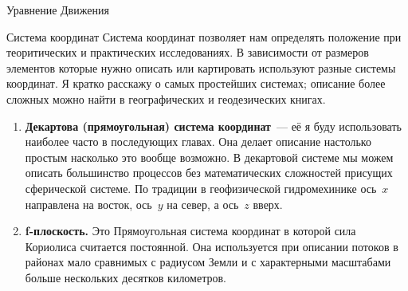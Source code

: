 \begin{chapter}{Уравнение Движения}
\begin{section}{Система координат}
Система координат позволяет нам определять положение при теоритических
и практических исследованиях. В зависимости от размеров элементов
которые нужно описать или картировать используют разные системы
координат. Я кратко расскажу о самых простейших системах; описание
более сложных можно найти в географических и геодезических книгах.
%

\begin{enumerate}
\item
\textbf{Декартова (прямоугольная) система координат}~--- её я буду
использовать наиболее часто в последующих главах. Она делает описание
настолько простым насколько это вообще возможно. В декартовой системе
мы можем описать большинство процессов без математических сложностей
присущих сферической системе. По традиции в геофизической
гидромехинике ось~$x$ направлена на восток, ось~$y$ на север, а
ось~$z$ вверх.
%

\item
\textbf{f-плоскость.} Это Прямоугольная система координат в которой
сила Кориолиса считается постоянной. Она используется при описании
потоков в районах мало сравнимых с радиусом Земли и с характерными
масштабами больше нескольких десятков километров.
%


\end{enumerate}
\end{section}
\end{chapter}
